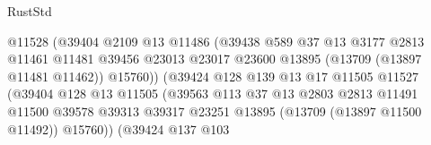 \begin{lexlean}{RustStd}
\begin{coremodule}
                                          @11528
                                          (@39404
                                            @2109
                                            @13
                                            @11486
                                            (@39438
                                              @589
                                              @37
                                              @13
                                              @3177
                                              @2813
                                              @11461
                                              @11481
                                              @39456
                                              @23013
                                              @23017
                                              @23600
                                              @13895
                                              (@13709 (@13897 @11481 @11462))
                                              @15760))
                                          (@39424
                                            @128
                                            @139
                                            @13
                                            @17
                                            @11505
                                            @11527
                                            (@39404
                                              @128
                                              @13
                                              @11505
                                              (@39563
                                                @113
                                                @37
                                                @13
                                                @2803
                                                @2813
                                                @11491
                                                @11500
                                                @39578
                                                @39313
                                                @39317
                                                @23251
                                                @13895
                                                (@13709 (@13897 @11500 @11492))
                                                @15760))
                                            (@39424
                                              @137
                                              @103

\end{coremodule}
\end{lexlean}
